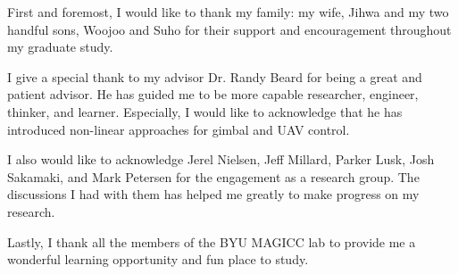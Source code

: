 \afterpage{\cleardoublepage}
%
First and foremost, I would like to thank my family: my wife, Jihwa and my two handful sons, Woojoo and Suho for their support and encouragement throughout my graduate study. 

I give a special thank to my advisor Dr. Randy Beard for being a great and patient advisor. He has guided me to be more capable researcher, engineer, thinker, and learner. Especially, I would like to acknowledge that he has introduced non-linear approaches for gimbal and UAV control. 

I also would like to acknowledge Jerel Nielsen, Jeff Millard, Parker Lusk, Josh Sakamaki, and Mark Petersen for the engagement as a research group. The discussions I had with them has helped me greatly to make progress on my research. 

Lastly, I thank all the members of the BYU MAGICC lab to provide me a wonderful learning opportunity and fun place to study. 